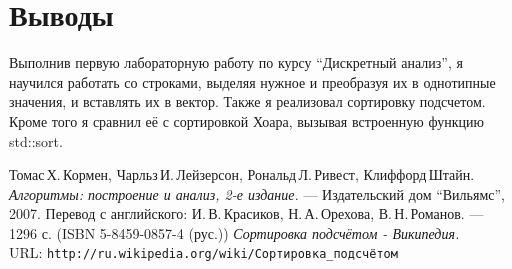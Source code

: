 \documentclass{article}
\begin{document}
\pagebreak
\section{Выводы}
Выполнив первую лабораторную работу по курсу \enquote{Дискретный анализ}, я научился работать со строками, выделяя нужное и преобразуя их в однотипные значения, и вставлять их в вектор. Также я реализовал сортировку подсчетом. Кроме того я сравнил её с сортировкой Хоара, вызывая встроенную функцию std::sort.
\pagebreak
\begin{thebibliography}{99}
Томас\,Х.\,Кормен, Чарльз\,И.\,Лейзерсон, Рональд\,Л.\,Ривест, Клиффорд\,Штайн.
{\itshape Алгоритмы: построение и анализ, 2-е издание.} --- Издательский дом \enquote{Вильямс}, 2007. Перевод с английского: И.\,В.\,Красиков, Н.\,А.\,Орехова, В.\,Н.\,Романов. --- 1296 с. (ISBN 5-8459-0857-4 (рус.))
{\itshape Сортировка подсчётом - Википедия.} \\URL: \texttt{http://ru.wikipedia.org/wiki/Сортировка\_подсчётом}
\end{thebibliography}
\pagebreak
\end{document}
